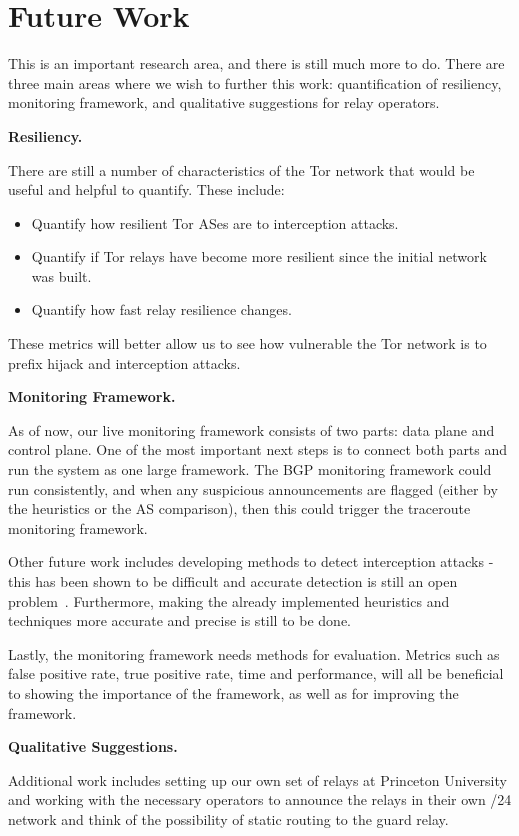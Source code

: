 \section{Future Work}

This is an important research area, and there is still much more to do.  There are three main areas where we wish to further this work: quantification of resiliency, monitoring framework, and qualitative suggestions for relay operators.

{\bf Resiliency.}  

There are still a number of characteristics of the Tor network that would be useful and helpful to quantify.  These include:

\begin{itemize}
\item Quantify how resilient Tor ASes are to interception attacks.
\item Quantify if Tor relays have become more resilient since the initial network was built.
\item Quantify how fast relay resilience changes.
\end{itemize}

These metrics will better allow us to see how vulnerable the Tor network is to prefix hijack and interception attacks.  

{\bf Monitoring Framework.}  

As of now, our live monitoring framework consists of two parts: data plane and control plane.  One of the most important next steps is to connect both parts and run the system as one large framework.  The BGP monitoring framework could run consistently, and when any suspicious announcements are flagged (either by the heuristics or the AS comparison), then this could trigger the traceroute monitoring framework.  

Other future work includes developing methods to detect interception attacks - this has been shown to be difficult and accurate detection is still an open problem~\cite{ballani2007study}.  Furthermore, making the already implemented heuristics and techniques more accurate and precise is still to be done.  

Lastly, the monitoring framework needs methods for evaluation.  Metrics such as false positive rate, true positive rate, time and performance, will all be beneficial to showing the importance of the framework, as well as for improving the framework.  

{\bf Qualitative Suggestions.}

Additional work includes setting up our own set of relays at Princeton University and working with the necessary operators to announce the relays in their own /24 network and think of the possibility of static routing to the guard relay.
